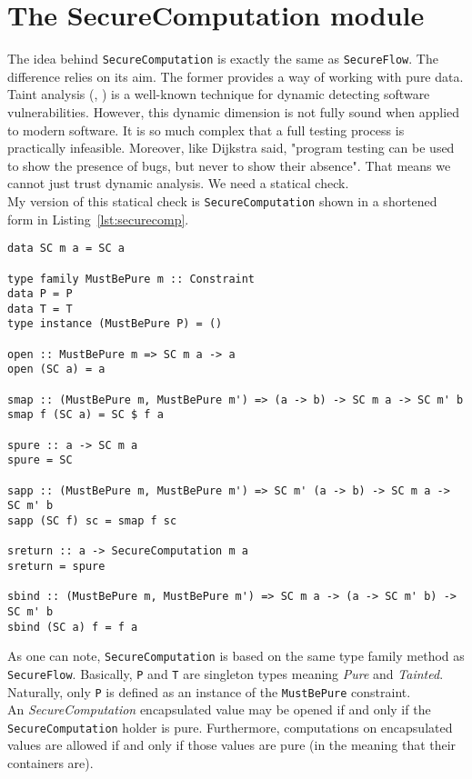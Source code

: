 \section{The SecureComputation module}\label{sec:computation}
The idea behind \texttt{SecureComputation} is exactly the same as \texttt{SecureFlow}. The difference relies on its aim. The former provides a way of working with pure data. \\
Taint analysis (\cite{schwartz2010all}, \cite{newsome2005dynamic}) is a well-known technique for dynamic detecting software vulnerabilities. However, this dynamic dimension is not fully sound when applied to modern software. It is so much complex that a full testing process is practically infeasible. Moreover, like Dijkstra said, "program testing can be used to show the presence of bugs, but never to show their absence". That means we cannot just trust dynamic analysis. We need a statical check. \\
My version of this statical check is \texttt{SecureComputation} shown in a shortened form in Listing~\ref{lst:securecomp}.
\begin{lstlisting}[caption={SecureComputation module}, label={lst:securecomp}, breaklines=true]
data SC m a = SC a

type family MustBePure m :: Constraint
data P = P
data T = T
type instance (MustBePure P) = ()

open :: MustBePure m => SC m a -> a
open (SC a) = a

smap :: (MustBePure m, MustBePure m') => (a -> b) -> SC m a -> SC m' b
smap f (SC a) = SC $ f a

spure :: a -> SC m a
spure = SC

sapp :: (MustBePure m, MustBePure m') => SC m' (a -> b) -> SC m a -> SC m' b
sapp (SC f) sc = smap f sc

sreturn :: a -> SecureComputation m a
sreturn = spure

sbind :: (MustBePure m, MustBePure m') => SC m a -> (a -> SC m' b) -> SC m' b
sbind (SC a) f = f a
\end{lstlisting}
As one can note, \texttt{SecureComputation} is based on the same type family method as \texttt{SecureFlow}. Basically, \texttt{P} and \texttt{T} are singleton types meaning \textit{Pure} and \textit{Tainted}. Naturally, only \texttt{P} is defined as an instance of the \texttt{MustBePure} constraint. \\
An \textit{SecureComputation} encapsulated value may be opened if and only if the \texttt{SecureComputation} holder is pure. Furthermore, computations on encapsulated values are allowed if and only if those values are pure (in the meaning that their containers are). \\
